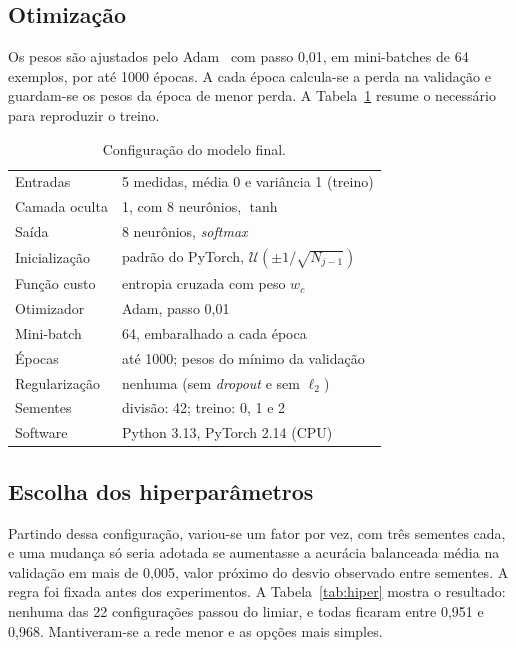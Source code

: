 \documentclass{sbrt}
\begin{document}
\subsection{Otimização}

Os pesos são ajustados pelo Adam~\cite{adam} com passo 0,01, em mini-batches de 64 exemplos, por até 1000 épocas. A cada época calcula-se a perda na validação e guardam-se os pesos da época de menor perda. A Tabela~\ref{tab:config} resume o necessário para reproduzir o treino.

\begin{table}[htb]
\caption{\label{tab:config}Configuração do modelo final.}
\begin{center}
\begin{tabular}{ll}\hline
Entradas & 5 medidas, média 0 e variância 1 (treino)\\
Camada oculta & 1, com 8 neurônios, $\tanh$\\
Saída & 8 neurônios, \textit{softmax}\\
Inicialização & padrão do PyTorch, $\mathcal{U}(\pm 1/\sqrt{N_{j-1}})$\\
Função custo & entropia cruzada com peso $w_c$\\
Otimizador & Adam, passo 0,01\\
Mini-batch & 64, embaralhado a cada época\\
Épocas & até 1000; pesos do mínimo da validação\\
Regularização & nenhuma (sem \textit{dropout} e sem $\ell_2$)\\
Sementes & divisão: 42; treino: 0, 1 e 2\\
Software & Python 3.13, PyTorch 2.14 (CPU)\\\hline
\end{tabular}
\end{center}
\end{table}

\subsection{Escolha dos hiperparâmetros}

Partindo dessa configuração, variou-se um fator por vez, com três sementes cada, e uma mudança só seria adotada se aumentasse a acurácia balanceada média na validação em mais de 0,005, valor próximo do desvio observado entre sementes. A regra foi fixada antes dos experimentos. A Tabela~\ref{tab:hiper} mostra o resultado: nenhuma das 22 configurações passou do limiar, e todas ficaram entre 0,951 e 0,968. Mantiveram-se a rede menor e as opções mais simples.
\end{document}
